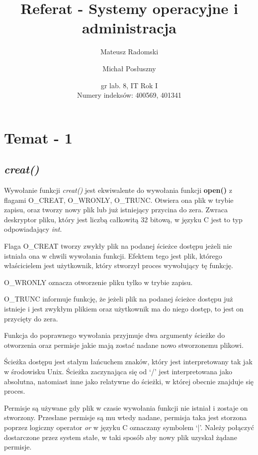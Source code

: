 \documentclass{article}
\title{Referat - Systemy operacyjne i administracja}
\author{Mateusz Radomski \and Michał Posłuszny}
\date{gr lab. 8, IT Rok I \\ Numery indeksów: 400569, 401341 }
\begin{document}
\maketitle

\section{Temat - 1}
\subsection{\textit{creat()}}
Wywołanie funkcji \textit{creat()} jest ekwiwalente do wywołania funkcji \textbf{open()} z flagami O\_CREAT, O\_WRONLY, O\_TRUNC.
Otwiera ona plik w trybie zapisu, oraz tworzy nowy plik lub już istniejący przycina do zera.
Zwraca deskryptor pliku, który jest liczbą całkowitą 32 bitową, w języku C jest to typ odpowiadający \textit{int}.

Flaga O\_CREAT tworzy zwykły plik na podanej ścieżce dostępu jeżeli nie istniała ona w chwili wywołania funkcji. Efektem tego jest plik, którego właścicielem jest użytkownik, który stworzył proces wywołujący tę funkcję.

O\_WRONLY oznacza otworzenie pliku tylko w trybie zapisu.

O\_TRUNC informuje funkcję, że jeżeli plik na podanej ścieżce dostępu już istnieje i jest zwykłym plikiem oraz użytkownik ma do niego dostęp, to jest on przycięty do zera.

Funkcja do poprawnego wywołania przyjmuje dwa argumenty ścieżke do otworzenia oraz permisje jakie mają zostać nadane nowo stworzonemu plikowi.

Ścieżka dostępu jest stałym łańcuchem znaków, który jest interpretowany tak jak w środowisku Unix.
Ścieżka zaczynająca się od `/' jest interpretowana jako absolutna, natomiast inne jako relatywne do
ścieżki, w której obecnie znajduje się proces.

Permisje są używane gdy plik w czasie wywołania funkcji nie istniał i zostaje on stworzony.
Przesłane permisje są mu wtedy nadane, permisja taka jest storzona poprzez logiczny operator
\textit{or} w języku C oznaczany symbolem `|'. Należy połączyć dostarczone przez system stałe,
w taki sposób aby nowy plik uzyskał żądane permisje.
\end{document}
